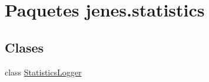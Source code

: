 \hypertarget{namespacejenes_1_1statistics}{\section{Paquetes jenes.\-statistics}
\label{namespacejenes_1_1statistics}
}
\subsection*{Clases}
\begin{DoxyCompactItemize}
\item 
class \hyperlink{classjenes_1_1statistics_1_1_statistics_logger}{Statistics\-Logger}
\end{DoxyCompactItemize}

